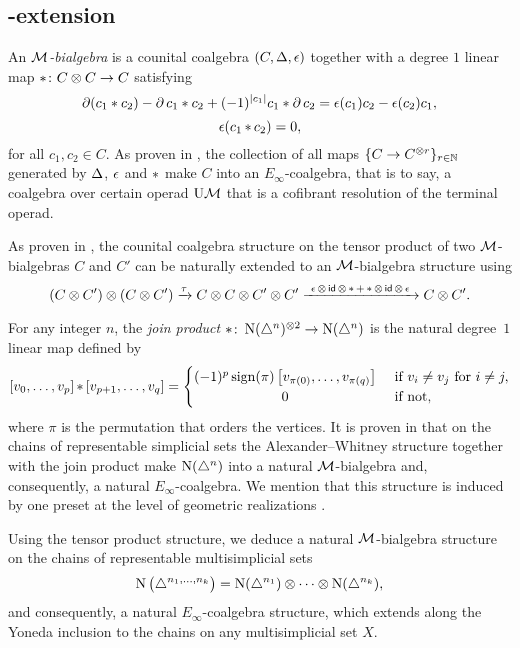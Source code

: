 \subsection{\pdfEinfty-extension}\label{ss:e-infty extension}

An \textit{$\mathcal{M}$-bialgebra} is a counital coalgebra $(C, \operatorname{\Delta}, \operatorname{\epsilon})$ together with a degree $1$ linear map $\operatorname{\ast} \colon C \otimes C \to C$ satisfying
\[
\operatorname{\partial} (c_1 \ast c_2) - \operatorname{\partial} c_1 \ast c_2 + (-1)^{\lvert c_1\rvert} c_1 \ast \operatorname{\partial} c_2 =
\operatorname{\epsilon}(c_1) c_2 - \operatorname{\epsilon}(c_2) c_1,
\]
\[
\operatorname{\epsilon} (c_1 \operatorname{\ast} c_2) = 0,
\]
for all $c_1, c_2 \in C$.
As proven in \cite{medina2020prop1}, the collection of all maps $\{C \to C^{\otimes r}\}_{r \in \mathbb{N}}$ generated by $\operatorname{\Delta}$, $\operatorname{\epsilon}$ and $\operatorname{\ast}$ make $C$ into an $E_\infty$-coalgebra, that is to say, a coalgebra over certain operad $\mathrm{U}\mathcal{M}$ that is a cofibrant resolution of the terminal operad.

As proven in \cite{medina2021cobar}, the counital coalgebra structure on the tensor product of two $\mathcal{M}$-bialgebras $C$ and $C'$ can be naturally extended to an $\mathcal{M}$-bialgebra structure using
\[
(C \otimes C^\prime) \otimes (C \otimes C^\prime) \xrightarrow{\tau}
C \otimes C \otimes C^\prime \otimes C^\prime
\xrightarrow{\ \operatorname{\epsilon} \otimes \, \mathsf{id} \, \otimes \, \operatorname{\ast} + \operatorname{\ast} \otimes \, \mathsf{id} \, \otimes \,\operatorname{\epsilon}\ }
C \otimes C^\prime.
\]

For any integer $n$, the \textit{join product} $\ast \colon \operatorname{N}(\triangle^n)^{\otimes 2} \to \operatorname{N}(\triangle^n)$ is the natural degree~$1$ linear map defined by
\begin{equation*}
	\left[v_0, \dots, v_p \right] \pr \left[v_{p+1}, \dots, v_q\right] =
	\begin{cases}
		(-1)^{p} \sign(\pi) \left[v_{\pi(0)}, \dots, v_{\pi(q)}\right] &
		\text{ if } v_i \neq v_j \text{ for } i \neq j, \\
		\hfil 0 & \text{ if not},
	\end{cases}
\end{equation*}
where $\pi$ is the permutation that orders the vertices.
It is proven in \cite{medina2020prop1} that on the chains of representable simplicial sets the Alexander--Whitney structure together with the join product make $\operatorname{N}(\triangle^n)$ into a natural $\mathcal{M}$-bialgebra and, consequently, a natural $E_\infty$-coalgebra.
We mention that this structure is induced by one preset at the level of geometric realizations \cite{medina2021prop2}.

Using the tensor product structure, we deduce a natural $\mathcal{M}$-bialgebra structure on the chains of representable multisimplicial sets
\[
\operatorname{N}\big(\triangle^{n_1,\dots,n_k}\big) =
\operatorname{N}(\triangle^{n_1}) \otimes\dotsb\otimes \operatorname{N}(\triangle^{n_k}),
\]
and consequently, a natural $E_\infty$-coalgebra structure, which extends along the Yoneda inclusion to the chains on any multisimplicial set $X$.

